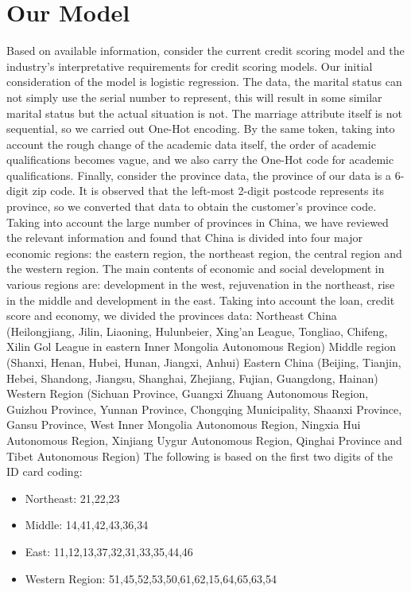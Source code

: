 \documentclass{mcmthesis}
\begin{document}
\section{Our Model}
Based on available information, consider the current credit scoring model and the industry's interpretative requirements for credit scoring models. Our initial consideration of the model is logistic regression.
\newline
The data, the marital status can not simply use the serial number to represent, this will result in some similar marital status but the actual situation is not. The marriage attribute itself is not sequential, so we carried out One-Hot encoding. By the same token, taking into account the rough change of the academic data itself, the order of academic qualifications becomes vague, and we also carry the One-Hot code for academic qualifications. Finally, consider the province data, the province of our data is a 6-digit zip code. It is observed that the left-most 2-digit postcode represents its province, so we converted that data to obtain the customer's province code. Taking into account the large number of provinces in China, we have reviewed the relevant information and found that China is divided into four major economic regions: the eastern region, the northeast region, the central region and the western region. The main contents of economic and social development in various regions are: development in the west, rejuvenation in the northeast, rise in the middle and development in the east. Taking into account the loan, credit score and economy, we divided the provinces data:
\newline
Northeast China (Heilongjiang, Jilin, Liaoning, Hulunbeier, Xing'an League, Tongliao, Chifeng, Xilin Gol League in eastern Inner Mongolia Autonomous Region)
\newline
Middle region (Shanxi, Henan, Hubei, Hunan, Jiangxi, Anhui)
\newline
Eastern China (Beijing, Tianjin, Hebei, Shandong, Jiangsu, Shanghai, Zhejiang, Fujian, Guangdong, Hainan)
\newline
Western Region (Sichuan Province, Guangxi Zhuang Autonomous Region, Guizhou Province, Yunnan Province, Chongqing Municipality, Shaanxi Province, Gansu Province, West Inner Mongolia Autonomous Region, Ningxia Hui Autonomous Region, Xinjiang Uygur Autonomous Region, Qinghai Province and Tibet Autonomous Region)
\newline
The following is based on the first two digits of the ID card coding:
\begin{itemize}
  \item Northeast: 21,22,23
  \item Middle: 14,41,42,43,36,34
  \item East: 11,12,13,37,32,31,33,35,44,46  
  \item Western Region: 51,45,52,53,50,61,62,15,64,65,63,54
\end{itemize}
\end{document}
